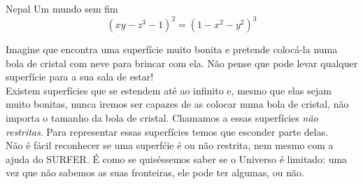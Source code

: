 \begin{surferPage}{Nepal}
Um mundo sem fim \\

\smallskip
\[(x y - z^3 -1)^2= (1 - x^2	- y^2)^3\]

\singlespacing
Imagine que encontra uma superf\'icie muito bonita e pretende coloc\'a-la numa bola de cristal com neve para brincar com ela.  N\~ao pense que  pode levar qualquer superf\'icie para a sua sala de estar!
\\
\singlespacing
Existem superf\'icies que se estendem at\'e ao infinito e, mesmo que elas sejam muito bonitas, nunca iremos ser capazes de as colocar numa bola de cristal, n\~ao importa o tamanho da bola de cristal. Chamamos a essas superf\'icies \textit{n\~ao restritas}. Para representar essas superf\'icies temos que esconder parte delas.
\\
\singlespacing
N\~ao \'e f\'acil reconhecer se uma superf\'cie \'e ou n\~ao  restrita, nem mesmo com a ajuda do SURFER. 
\'E como se quis\'essemos saber se o Universo \'e limitado: uma vez que  n\~ao sabemos as suas fronteiras, ele pode ter algumas, ou n\~ao.
\end{surferPage}
